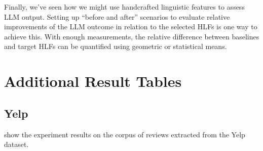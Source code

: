 \documentclass[a4paper,twoside]{article}
\begin{document}
Finally, we've seen how we might use handcrafted linguistic features to assess
LLM output.
Setting up ``before and after'' scenarios to evaluate relative improvements of
the LLM outcome in relation to the selected HLFs is one way to achieve this.
With enough measurements, the relative difference between baselines and target
HLFs can be quantified using geometric or statistical means.



\appendix

\section{Additional Result Tables}\label{sec:yelp-tables}
\subsection{Yelp}
 show the
experiment results on the corpus of reviews extracted from the Yelp dataset.
\end{document}
